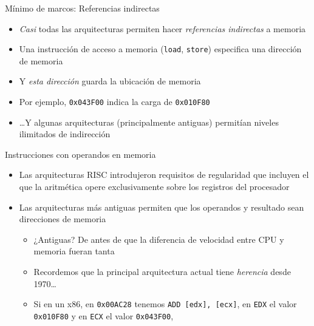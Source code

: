 \documentclass[presentation]{beamer}
\newcommand{\rarrow}{$\rightarrow$\hskip 0.5em}
\begin{document}
\begin{frame}[label={sec:org14f6fff},fragile]{Mínimo de marcos: Referencias indirectas}
 \begin{itemize}
\item \emph{Casi} todas las arquitecturas permiten hacer \emph{referencias
indirectas} a memoria
\item Una instrucción de acceso a memoria (\texttt{load}, \texttt{store}) especifica
una dirección de memoria
\item Y \emph{esta dirección} guarda la ubicación de memoria
\item Por ejemplo, \texttt{0x043F00} indica la carga de \texttt{0x010F80}
\item \ldots{}Y algunas arquitecturas (principalmente antiguas) permitían
niveles ilimitados de indirección
\end{itemize}
\end{frame}

\begin{frame}[label={sec:orge4447db},fragile]{Instrucciones con operandos en memoria}
 \begin{itemize}
\item Las arquitecturas RISC introdujeron requisitos de regularidad que
incluyen el que la aritmética opere exclusivamente sobre los
registros del procesador
\item Las arquitecturas más antiguas permiten que los operandos y
resultado sean direcciones de memoria
\begin{itemize}
\item ¿Antiguas? De antes de que la diferencia de velocidad entre CPU y
memoria fueran tanta
\item Recordemos que la principal arquitectura actual tiene \emph{herencia}
desde 1970\ldots{}
\item Si en un x86, en \texttt{0x00AC28} tenemos \texttt{ADD [edx], [ecx]}, en \texttt{EDX}
el valor \texttt{0x010F80} y en \texttt{ECX} el valor \texttt{0x043F00},
\end{itemize}
\end{itemize}
\end{frame}
\end{document}
